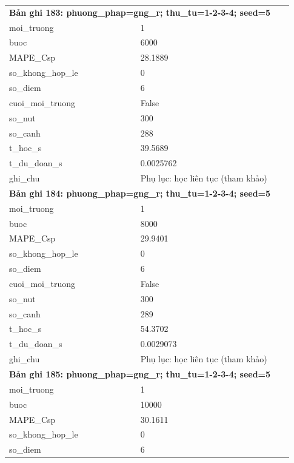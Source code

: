 \begin{longtable}{p{0.43\linewidth}p{0.50\linewidth}}
\midrule
\multicolumn{2}{p{0.95\linewidth}}{\textbf{Bản ghi 183: phuong\_phap=gng\_r; thu\_tu=1-2-3-4; seed=5}} \\
moi\_\allowbreak truong & 1 \\
buoc & 6000 \\
MAPE\_\allowbreak Csp & 28.1889 \\
so\_\allowbreak khong\_\allowbreak hop\_\allowbreak le & 0 \\
so\_\allowbreak diem & 6 \\
cuoi\_\allowbreak moi\_\allowbreak truong & False \\
so\_\allowbreak nut & 300 \\
so\_\allowbreak canh & 288 \\
t\_\allowbreak hoc\_\allowbreak s & 39.5689 \\
t\_\allowbreak du\_\allowbreak doan\_\allowbreak s & 0.0025762 \\
ghi\_\allowbreak chu & Phụ lục: học liên tục (tham khảo) \\
\midrule
\multicolumn{2}{p{0.95\linewidth}}{\textbf{Bản ghi 184: phuong\_phap=gng\_r; thu\_tu=1-2-3-4; seed=5}} \\
moi\_\allowbreak truong & 1 \\
buoc & 8000 \\
MAPE\_\allowbreak Csp & 29.9401 \\
so\_\allowbreak khong\_\allowbreak hop\_\allowbreak le & 0 \\
so\_\allowbreak diem & 6 \\
cuoi\_\allowbreak moi\_\allowbreak truong & False \\
so\_\allowbreak nut & 300 \\
so\_\allowbreak canh & 289 \\
t\_\allowbreak hoc\_\allowbreak s & 54.3702 \\
t\_\allowbreak du\_\allowbreak doan\_\allowbreak s & 0.0029073 \\
ghi\_\allowbreak chu & Phụ lục: học liên tục (tham khảo) \\
\midrule
\multicolumn{2}{p{0.95\linewidth}}{\textbf{Bản ghi 185: phuong\_phap=gng\_r; thu\_tu=1-2-3-4; seed=5}} \\
moi\_\allowbreak truong & 1 \\
buoc & 10000 \\
MAPE\_\allowbreak Csp & 30.1611 \\
so\_\allowbreak khong\_\allowbreak hop\_\allowbreak le & 0 \\
so\_\allowbreak diem & 6 \\

\end{longtable}
